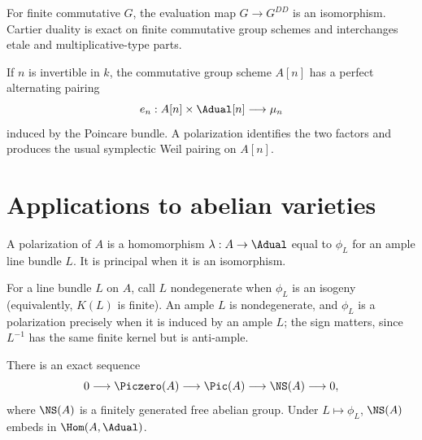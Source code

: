 \begin{theorem}
\label{mumford-thm-cartier-biduality}
For finite commutative $G$, the evaluation map $G\to G^{DD}$ is an
isomorphism.  Cartier duality is exact on finite commutative group schemes and
interchanges etale and multiplicative-type parts.
\notready
\end{theorem}

\begin{proposition}
\label{mumford-prop-weil-pairing}
If $n$ is invertible in $k$, the commutative group scheme $A[n]$ has a perfect
alternating pairing
\[
 e_n:A[n]\times\Adual[n]\longrightarrow\mu_n
\]
induced by the Poincare bundle.  A polarization identifies the two factors and
produces the usual symplectic Weil pairing on $A[n]$.
\notready
\end{proposition}

\section[Applications]{Applications to abelian varieties}
\label{mumford-III15}

\begin{definition}[Polarization]
\label{mumford-def-polarization}
A polarization of $A$ is a homomorphism $\lambda:A\to\Adual$ equal to
$\phi_L$ for an ample line bundle $L$.  It is principal when it is an
isomorphism.
\notready
\end{definition}

\begin{theorem}
\label{mumford-thm-ample-finite-kernel}
For a line bundle $L$ on $A$, call $L$ nondegenerate when $\phi_L$ is an
isogeny (equivalently, $K(L)$ is finite).  An ample $L$ is nondegenerate, and
$\phi_L$ is a polarization precisely when it is induced by an ample $L$; the
sign matters, since $L^{-1}$ has the same finite kernel but is anti-ample.
\notready
\end{theorem}

\begin{proposition}
\label{mumford-prop-pic-ns-sequence}
There is an exact sequence
\[
 0\longrightarrow\Piczero(A)\longrightarrow\Pic(A)\longrightarrow
 \NS(A)\longrightarrow0,
\]
where $\NS(A)$ is a finitely generated free abelian group.  Under
$L\mapsto\phi_L$, $\NS(A)$ embeds in $\Hom(A,\Adual)$.
\notready
\end{proposition}

